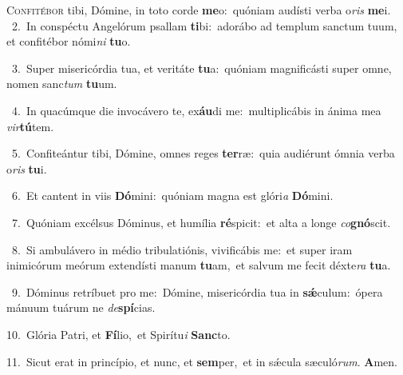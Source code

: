 \lettrine{\initial\textcolor{\initialcolor}{C}}{onfitébor} tibi, Dómine, in toto corde \textbf{me}\-o:~\star quóniam audísti verba o\textit{ris} \textbf{me}\-i.\\
{\numbfont\textcolor{\numbcolor}{~2.}}~In conspéctu Angelórum psallam \textbf{ti}\-bi:~\star adorábo ad templum sanctum tuum, et confitébor nómi\textit{ni} \textbf{tu}\-o.\par
{\numbfont\textcolor{\numbcolor}{~3.}}~Super misericórdia tua, et veritáte \textbf{tu}\-a:~\star quóniam magnificásti super omne, nomen sanc\textit{tum} \textbf{tu}\-um.\par
{\numbfont\textcolor{\numbcolor}{~4.}}~In quacúmque die invocávero te, ex\-\textbf{áu}\-di me:~\star multiplicábis in ánima mea \textit{vir}\-\textbf{tú}tem.\par
{\numbfont\textcolor{\numbcolor}{~5.}}~Confiteántur tibi, Dómine, omnes reges \textbf{ter}\-ræ:~\star quia audiérunt ómnia verba o\textit{ris} \textbf{tu}\-i.\par
{\numbfont\textcolor{\numbcolor}{~6.}}~Et cantent in viis \textbf{Dó}\-mini:~\star quóniam magna est glóri\textit{a} \textbf{Dó}\-mini.\par
{\numbfont\textcolor{\numbcolor}{~7.}}~Quóniam excélsus Dóminus, et humília \textbf{ré}\-spicit:~\star et alta a longe \textit{co}\-\textbf{gnó}scit.\par
{\numbfont\textcolor{\numbcolor}{~8.}}~Si ambulávero in médio tribulatiónis, vivificábis me:~\dagger et super iram inimicórum meórum extendísti manum \textbf{tu}\-am,~\star et salvum me fecit déxte\textit{ra} \textbf{tu}\-a.\par
{\numbfont\textcolor{\numbcolor}{~9.}}~Dóminus retríbuet pro me:~\dagger Dómine, misericórdia tua in \textbf{sǽ}\-culum:~\star ópera mánuum tuárum ne \textit{de}\-\textbf{spí}cias.\par
{\numbfont\textcolor{\numbcolor}{10.}}~Glória Patri, et \textbf{Fí}\-lio,~\star et Spirítu\textit{i} \textbf{Sanc}\-to.\par
{\numbfont\textcolor{\numbcolor}{11.}}~Sicut erat in princípio, et nunc, et \textbf{sem}\-per,~\star et in sǽcula sæculó\-\textit{rum}\-. \textbf{A}\-men.\par
